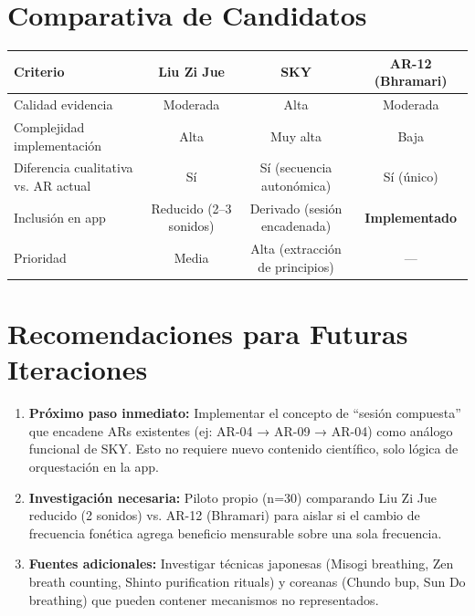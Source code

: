 \documentclass[12pt,a4paper]{article}
\begin{document}
\section{Comparativa de Candidatos}

\begin{tabularx}{\textwidth}{lccc}
    \toprule
    \textbf{Criterio} & \textbf{Liu Zi Jue} & \textbf{SKY} & \textbf{AR-12 (Bhramari)} \\
    \midrule
    Calidad evidencia & Moderada & Alta & Moderada \\
    Complejidad implementación & Alta & Muy alta & Baja \\
    Diferencia cualitativa vs. AR actual & Sí & Sí (secuencia autonómica) & Sí (único) \\
    Inclusión en app & Reducido (2--3 sonidos) & Derivado (sesión encadenada) & \textbf{Implementado} \\
    Prioridad & Media & Alta (extracción de principios) & --- \\
    \bottomrule
\end{tabularx}

\section{Recomendaciones para Futuras Iteraciones}

\begin{enumerate}
    \item \textbf{Próximo paso inmediato:} Implementar el concepto de
          ``sesión compuesta'' que encadene ARs existentes (ej: AR-04 →
          AR-09 → AR-04) como análogo funcional de SKY. Esto no requiere
          nuevo contenido científico, solo lógica de orquestación en la app.
    \item \textbf{Investigación necesaria:} Piloto propio (n=30) comparando
          Liu Zi Jue reducido (2 sonidos) vs. AR-12 (Bhramari) para aislar
          si el cambio de frecuencia fonética agrega beneficio mensurable
          sobre una sola frecuencia.
    \item \textbf{Fuentes adicionales:} Investigar técnicas japonesas
          (Misogi breathing, Zen breath counting, Shinto purification
          rituals) y coreanas (Chundo bup, Sun Do breathing) que pueden
          contener mecanismos no representados.
\end{enumerate}
\end{document}

